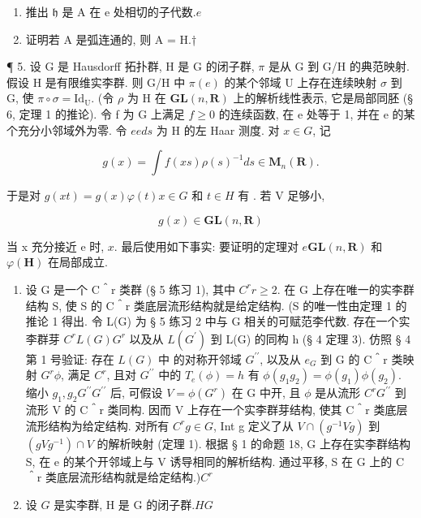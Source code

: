 \begin{enumerate}
\def\labelenumi{(\alph{enumi})}
\setcounter{enumi}{2}
\item
  推出 \(\mathfrak{h}\) 是 A 在 e 处相切的子代数.\(e\)
\item
  证明若 A 是弧连通的, 则 A = H.†
\end{enumerate}

¶ 5. 设 G 是 Hausdorff 拓扑群, H 是 G 的闭子群, \(\pi\) 是从 G 到 G/H 的典范映射. 假设 H 是有限维实李群. 则 G/H 中 \(\pi(e)\) 的某个邻域 U 上存在连续映射 \(\sigma\) 到 G, 使 \(\pi \circ \sigma = \mathrm{Id}_{\mathrm{U}}\). (令 \(\rho\) 为 H 在 \(\mathbf{GL}(n,\mathbf{R})\) 上的解析线性表示, 它是局部同胚 (§ 6, 定理 1 的推论). 令 f 为 G 上满足 \(f\)\(\geqslant 0\) 的连续函数, 在 e 处等于 1, 并在 e 的某个充分小邻域外为零. 令 \(e\)\(e\)\(ds\) 为 H 的左 Haar 测度. 对 \(x \in G\), 记

\[
g (x) = \int f (x s) \rho (s) ^ {- 1} d s \in \mathbf {M} _ {n} (\mathbf {R}).
\]

于是对 \(g(xt) = g(x)\varphi(t)\)\(x \in G\) 和 \(t \in H\) 有 . 若 V 足够小,

\[
g (x) \in \mathbf {G L} (n, \mathbf {R})
\]

当 x 充分接近 e 时, \(x\). 最后使用如下事实: 要证明的定理对 \(e\)\(\mathbf{GL}(n, \mathbf{R})\) 和 \(\varphi(\mathbf{H})\) 在局部成立.

\begin{enumerate}
\def\labelenumi{\arabic{enumi}.}
\setcounter{enumi}{5}
\item
  设 G 是一个 C＾r 类群 (§ 5 练习 1), 其中 \(C^{r}\)\(r \geqslant 2\). 在 G 上存在唯一的实李群结构 S, 使 S 的 C＾r 类底层流形结构就是给定结构. (S 的唯一性由定理 1 的推论 1 得出. 令 L(G) 为 § 5 练习 2 中与 G 相关的可赋范李代数. 存在一个实李群芽 \(C^{r}\)\(L(G)\)\(G^{r}\) 以及从 \(L(G^{\prime})\) 到 L(G) 的同构 h (§ 4 定理 3). 仿照 § 4 第 1 号验证: 存在 \(L(G)\) 中  的对称开邻域 \(G^{\prime\prime}\), 以及从 \(e_{G}\) 到 G 的 C＾r 类映射 \(G^{r}\)\(\phi\), 满足 \(C^{r}\), 且对 \(G^{\prime\prime}\) 中的 \(T_{e}(\phi) = h\) 有 \(\phi(g_{1}g_{2}) = \phi(g_{1})\phi(g_{2})\). 缩小 \(g_{1}, g_{2}\)\(G^{\prime\prime}\)\(G^{\prime\prime}\) 后, 可假设 \(V = \phi(G^{r})\) 在 G 中开, 且 \(\phi\) 是从流形 \(C^{r}\)\(G^{\prime\prime}\) 到流形 V 的 C＾r 类同构. 因而 V 上存在一个实李群芽结构, 使其 C＾r 类底层流形结构为给定结构. 对所有 \(C^{r}\)\(g \in G\), Int g 定义了从 \(V \cap (g^{-1}Vg)\) 到 \((gVg^{-1}) \cap V\) 的解析映射 (定理 1). 根据 § 1 的命题 18, G 上存在实李群结构 S, 在 e 的某个开邻域上与 V 诱导相同的解析结构. 通过平移, S 在 G 上的 C＾r 类底层流形结构就是给定结构.)\(C^{r}\)
\item
  设 \(G\) 是实李群, H 是 G 的闭子群.\(H\)\(G\)
\end{enumerate}

